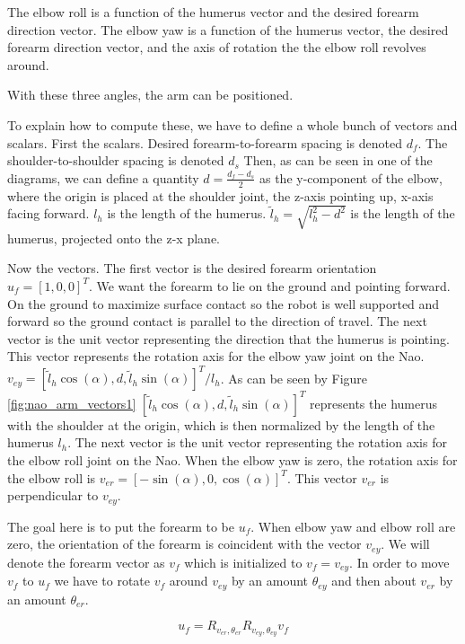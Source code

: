 The elbow roll is a function of the humerus vector and the desired forearm direction vector.
The elbow yaw is a function of the humerus vector, the desired forearm direction vector, and the axis of rotation
the the elbow roll revolves around.

With these three angles, the arm can be positioned.

To explain how to compute these, we have to define a whole bunch of vectors and scalars.
First the scalars.
Desired forearm-to-forearm spacing is denoted $d_f$.
The shoulder-to-shoulder spacing is denoted $d_s$
Then, as can be seen in one of the diagrams, we can define a quantity
$d = \frac{d_f - d_s}{2}$ as the y-component of the elbow, where the origin is placed at the shoulder joint,
the z-axis pointing up, x-axis facing forward.
$l_h$ is the length of the humerus.
$\tilde l_h = \sqrt{l_h^2 - d^2}$ is the length of the humerus, projected onto the z-x plane.

Now the vectors.
The first vector is the desired forearm orientation $u_f = [1, 0, 0]^T$. We want the forearm to lie on the ground
and pointing forward. On the ground to maximize surface contact so the robot is well supported and forward so the
ground contact is parallel to the direction of travel.
The next vector is the unit vector representing the direction that the humerus is pointing.
This vector represents the rotation axis for the elbow yaw joint on the Nao.
$v_{ey} = [\tilde l_h \cos(\alpha), d, \tilde l_h \sin(\alpha)]^T / l_h$.
As can be seen by Figure \ref{fig:nao_arm_vectors1} $[\tilde l_h \cos(\alpha), d, \tilde l_h \sin(\alpha)]^T$ represents
the humerus with the shoulder at the origin, which is then normalized by the length of the humerus $l_h$.
The next vector is the unit vector representing the rotation axis for the elbow roll joint on the Nao.
When the elbow yaw is zero, the rotation axis for the elbow roll is $v_{er} = [-\sin(\alpha), 0, \cos(\alpha)]^T$.
This vector $v_{er}$ is perpendicular to $v_{ey}$.

The goal here is to put the forearm to be $u_f$. When elbow yaw and elbow roll are zero, the orientation of the
forearm is coincident with the vector $v_{ey}$. We will denote the forearm vector as $v_f$ which is initialized to
$v_f = v_{ey}$.
In order to move $v_f$ to $u_f$ we have to rotate $v_f$ around $v_{ey}$ by an amount $\theta_{ey}$ and then about
$v_{er}$ by an amount $\theta_{er}$.

\begin{equation}
	u_f = R_{v_{er}, \theta_{er}} R_{v_{ey}, \theta_{ey}} v_f
\end{equation}

